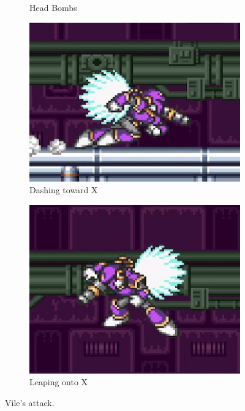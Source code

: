 \begin{figure}[htp]
\begin{subfigure}[t]{0.5\linewidth}
		\caption{Head Bombs}
	\end{subfigure}
	\begin{subfigure}[t]{0.4\linewidth}
		\centering
		\includegraphics[width=\linewidth]{figures/X1/Sigma_stages/Vile_dash.jpg}
		\caption{Dashing toward X}
	\end{subfigure}
	\begin{subfigure}[t]{0.4\linewidth}
		\centering
		\includegraphics[width=\linewidth]{figures/X1/Sigma_stages/Vile_leap.jpg}
		\caption{Leaping onto X}
	\end{subfigure}
	\caption{Vile's attack.}
\end{figure} 
